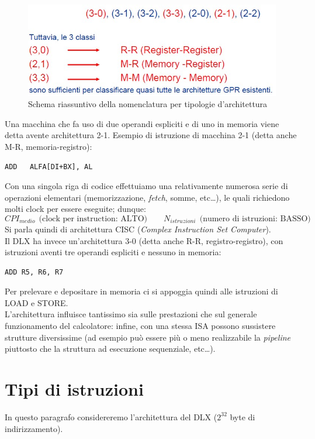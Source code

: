 \begin{figure}[!h]
\centering
\includegraphics[width=0.7\columnwidth]{img/tipiArchitetture}
\caption{Schema riassuntivo della nomenclatura per tipologie d'architettura}
\label{fig:tipiArchitettura}
\end{figure}

Una macchina che fa uso di due operandi espliciti e di uno in memoria viene detta avente architettura 2-1. 
Esempio di istruzione di macchina 2-1 (detta anche M-R, memoria-registro): 
\begin{verbatim}
ADD   ALFA[DI+BX], AL
\end{verbatim}
Con una singola riga di codice effettuiamo una relativamente numerosa serie di operazioni elementari (memorizzazione, \textit{fetch}, somme, etc\ldots), le quali richiedono molti clock per essere eseguite; dunque:
\[
CPI_{medio}~~ \text{(clock per instruction: ALTO)} ~~~~~~~~~ N_{istruzioni}~~ \text{(numero di istruzioni: BASSO)}
\]
Si parla quindi di architettura CISC (\textit{Complex Instruction Set Computer}). \\

Il DLX ha invece un'architettura 3-0 (detta anche R-R, registro-registro), con istruzioni aventi tre operandi espliciti e nessuno in memoria:
\begin{verbatim}
ADD R5, R6, R7
\end{verbatim}
Per prelevare e depositare in memoria ci si appoggia quindi alle istruzioni di LOAD e STORE. \\

L'architettura influisce tantissimo sia sulle prestazioni che sul generale funzionamento del calcolatore: infine, con una stessa ISA possono sussistere strutture diversissime (ad esempio può essere più o meno realizzabile la \textit{pipeline} piuttosto che la struttura ad esecuzione sequenziale, etc\ldots).

\section{Tipi di istruzioni}
\label{sec:tipiIstruzioni}

In questo paragrafo considereremo l'architettura del DLX ($2^{32}$ byte di indirizzamento).

